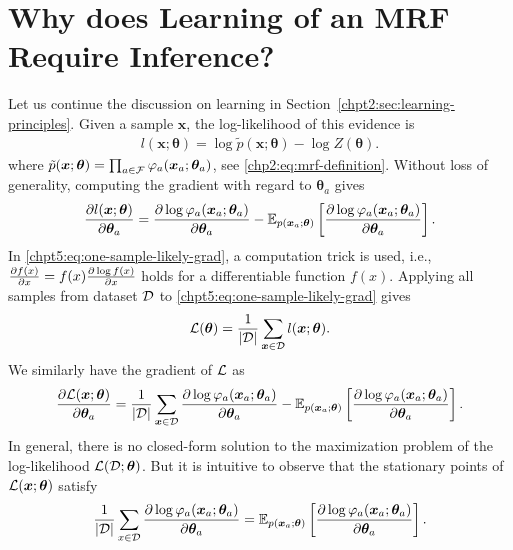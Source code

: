\section{Why does Learning of an MRF Require Inference?}
\label{chpt5:sec:learning-mrf}
Let us continue the discussion on learning in Section~\ref{chpt2:sec:learning-principles}. Given a sample $\bm{x}$, the log-likelihood of this evidence is
\begin{align}\label{chpt5:eq:one-sample-likely}
  l(\bm{x};\bm{\theta}) = \log{\tilde{p}(\bm{x}; \bm{\theta})} - \log{Z(\bm{\theta})}.
\end{align}
where $\tilde{p}(\bm{x}; \bm{\theta}) =  \prod_{a\in \mathcal{F}} \varphi_a(\bm{x}_a; \bm{\theta}_a)$, see \eqref{chp2:eq:mrf-definition}. 
Without loss of generality, computing the gradient with regard to $\bm{\theta}_a$ gives
\begin{align}\label{chpt5:eq:one-sample-likely-grad}
  \frac{ \partial l(\bm{x};\bm{\theta})}{\partial \bm{\theta}_a} = \frac{ \partial \log{{\varphi_a}(\bm{x}_a; \bm{\theta}_a)}}{\partial \bm{\theta}_a} - \mathbb{E}_{p(\bm{x}_a; \bm{\theta})}\left[ \frac{ \partial \log{{\varphi_a}(\bm{x}_a; \bm{\theta}_a)}}{\partial \bm{\theta}_a} \right].
\end{align}
In \eqref{chpt5:eq:one-sample-likely-grad}, a computation trick is used, i.e., $\frac{ \partial f(x)}{\partial x} = f(x) \frac{ \partial \log{f(x)}}{\partial x}$ holds for a differentiable function $f(x)$. Applying all samples from dataset $\mathcal{D}$ to \eqref{chpt5:eq:one-sample-likely-grad} gives
\begin{equation}\label{chpt4:eq:dataset-likely}
  \mathcal{L}(\bm{\theta}) = \frac{1}{|\mathcal{D} |} \sum_{\bm{x} \in \mathcal{D}} l(\bm{x}; \bm{\theta}).
\end{equation}
We similarly have the gradient of $\mathcal{L}$ as
\begin{equation}\label{chpt5:eq:likely-gradient-thetaa}
  \frac{ \partial \mathcal{L}(\bm{x};\bm{\theta})}{\partial \bm{\theta}_a} = \frac{1}{|\mathcal{D} |} \sum_{\bm{x} \in \mathcal{D}}\frac{ \partial \log{{\varphi_a}(\bm{x}_a; \bm{\theta}_a)}}{\partial \bm{\theta}_a} - \mathbb{E}_{p(\bm{x}_a; \bm{\theta})}\left[ \frac{ \partial \log{{\varphi_a}(\bm{x}_a; \bm{\theta}_a)}}{\partial \bm{\theta}_a} \right].
\end{equation}
In general, there is no closed-form solution to the maximization problem of the log-likelihood $\mathcal{L}(\mathcal{D}; \bm{\theta})$. But it is intuitive to observe that the stationary points of ${\mathcal{L}(\bm{x};\bm{\theta})}$ satisfy
\begin{equation}\label{chpt5:eq:stationary-point-likely}
  \frac{1}{|\mathcal{D} |} \sum_{x \in \mathcal{D}}\frac{ \partial \log{{\varphi_a}(\bm{x}_a; \bm{\theta}_a)}}{\partial \bm{\theta}_a} = \mathbb{E}_{p(\bm{x}_a; \bm{\theta})}\left[ \frac{ \partial \log{{\varphi_a}(\bm{x}_a; \bm{\theta}_a)}}{\partial \bm{\theta}_a} \right].
\end{equation}
